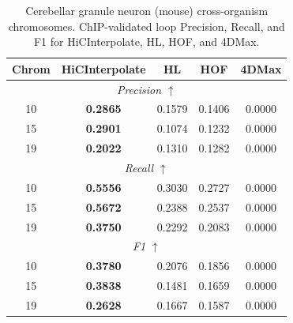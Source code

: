 \begin{table}[!htbp]
\centering
\caption{Cerebellar granule neuron (mouse) cross-organism chromosomes. ChIP-validated loop Precision, Recall, and F1 for HiCInterpolate, HL, HOF, and 4DMax.}
\label{tab:cross_cerebellar_chip_loops}
\begin{tabular}{|c|c|c|c|c|}
\hline
Chrom & HiCInterpolate & HL & HOF & 4DMax \\
\hline
\multicolumn{5}{|c|}{\textit{Precision} $\uparrow$} \\
\hline
10 & \textbf{0.2865} & 0.1579 & 0.1406 & 0.0000 \\
15 & \textbf{0.2901} & 0.1074 & 0.1232 & 0.0000 \\
19 & \textbf{0.2022} & 0.1310 & 0.1282 & 0.0000 \\
\hline
\multicolumn{5}{|c|}{\textit{Recall} $\uparrow$} \\
\hline
10 & \textbf{0.5556} & 0.3030 & 0.2727 & 0.0000 \\
15 & \textbf{0.5672} & 0.2388 & 0.2537 & 0.0000 \\
19 & \textbf{0.3750} & 0.2292 & 0.2083 & 0.0000 \\
\hline
\multicolumn{5}{|c|}{\textit{F1} $\uparrow$} \\
\hline
10 & \textbf{0.3780} & 0.2076 & 0.1856 & 0.0000 \\
15 & \textbf{0.3838} & 0.1481 & 0.1659 & 0.0000 \\
19 & \textbf{0.2628} & 0.1667 & 0.1587 & 0.0000 \\
\hline
\end{tabular}
\end{table}
